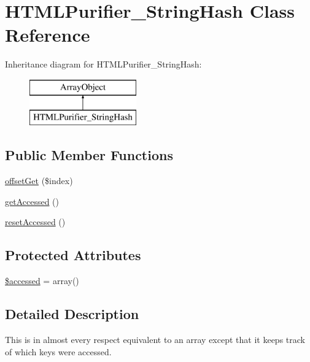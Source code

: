 \hypertarget{classHTMLPurifier__StringHash}{\section{H\+T\+M\+L\+Purifier\+\_\+\+String\+Hash Class Reference}
\label{classHTMLPurifier__StringHash}
}
Inheritance diagram for H\+T\+M\+L\+Purifier\+\_\+\+String\+Hash\+:\begin{figure}[H]
\begin{center}
\leavevmode
\includegraphics[height=2.000000cm]{classHTMLPurifier__StringHash}
\end{center}
\end{figure}
\subsection*{Public Member Functions}
\begin{DoxyCompactItemize}
\item 
\hyperlink{classHTMLPurifier__StringHash_a0abad28c560b41cb1cb676b37ade0991}{offset\+Get} (\$index)
\item 
\hyperlink{classHTMLPurifier__StringHash_a61503c478028d9c6195ea1e0d1bff070}{get\+Accessed} ()
\item 
\hyperlink{classHTMLPurifier__StringHash_a80ca20a91317f8016d3b86f503f70edf}{reset\+Accessed} ()
\end{DoxyCompactItemize}
\subsection*{Protected Attributes}
\begin{DoxyCompactItemize}
\item 
\hyperlink{classHTMLPurifier__StringHash_ab6ca407f3132961a9ac57a0eee2db3f2}{\$accessed} = array()
\end{DoxyCompactItemize}


\subsection{Detailed Description}
This is in almost every respect equivalent to an array except that it keeps track of which keys were accessed.

